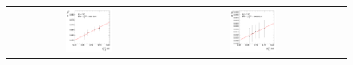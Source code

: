 \begin{figure}[ht]
\begin{tabular}{ccc}
    \includegraphics[width=0.3\textwidth]{figures/ResFit_Spring10QCDFlat_CB_Eta0_ExtrapolatedPar0_PtBin9} &
    \includegraphics[width=0.3\textwidth]{figures/ResFit_Spring10QCDFlat_CB_Eta0_ExtrapolatedPar0_PtBin10} & \\
  \end{tabular}
\caption{}
\label{fig:ResFit:App:CB:ExtrapolatedPar0}
\end{figure}

